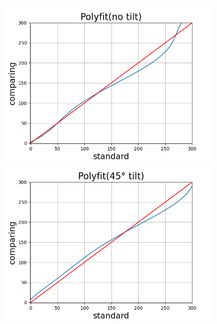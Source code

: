 \documentclass[conference]{IEEEtran}
\begin{document}
\begin{itemize}
\begin{itemize}
\begin{figure}[htbp]
  \begin{minipage}[t]{0.32\textwidth}
    \centering
    \includegraphics[width=\textwidth]{pics/Section3/Polyfit0.png}

  \end{minipage}
  \hfill
  \begin{minipage}[t]{0.32\textwidth}
    \centering
    \includegraphics[width=\textwidth]{pics/Section3/Polyfit45.png}


\end{minipage}
\end{figure}
\end{itemize}
\end{itemize}
\end{document}
